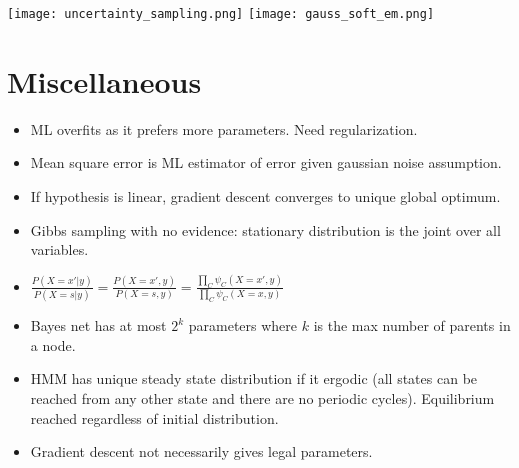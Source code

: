 \texttt{[image: uncertainty\_sampling.png]}
\texttt{[image: gauss\_soft\_em.png]}



\section{Miscellaneous}

\begin{itemize}
\item ML overfits as it prefers more parameters. Need regularization.
\item Mean square error is ML estimator of error given gaussian noise assumption.
\item If hypothesis is linear, gradient descent converges to unique global optimum.
\item Gibbs sampling with no evidence: stationary distribution is the joint over all variables.
\item $\frac{P(X = x' \vert y)}{P(X=s \vert y)} = \frac{P(X = x',  y)}{P(X=s, y)} = \frac{\prod_C \psi_C (X = x', y)}{\prod_C \psi_C (X = x, y)}$
\item Bayes net has at most $2^k$ parameters where $k$ is the max number of parents in a node.
\item HMM has unique steady state distribution if it ergodic (all states can be reached from any other state and there are no periodic cycles). Equilibrium reached regardless of initial distribution.
\item Gradient descent not necessarily gives legal parameters.
\end{itemize}



